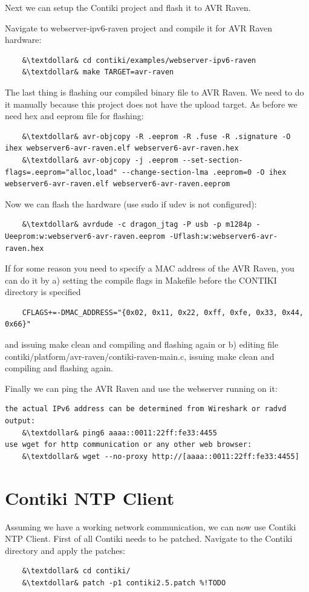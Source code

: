 \documentclass{article}
\begin{document}
Next we can setup the Contiki project and flash it to AVR Raven.

Navigate to webserver-ipv6-raven project and compile it for AVR Raven hardware:
\begin{lstlisting}
	&\textdollar& cd contiki/examples/webserver-ipv6-raven
	&\textdollar& make TARGET=avr-raven
\end{lstlisting}


The last thing is flashing our compiled binary file to AVR Raven. We need to do it manually because this project does not have the upload target.
As before we need hex and eeprom file for flashing:
\begin{lstlisting}
	&\textdollar& avr-objcopy -R .eeprom -R .fuse -R .signature -O ihex webserver6-avr-raven.elf webserver6-avr-raven.hex
	&\textdollar& avr-objcopy -j .eeprom --set-section-flags=.eeprom="alloc,load" --change-section-lma .eeprom=0 -O ihex webserver6-avr-raven.elf webserver6-avr-raven.eeprom
\end{lstlisting}
Now we can flash the hardware (use sudo if udev is not configured):
\begin{lstlisting}
	&\textdollar& avrdude -c dragon_jtag -P usb -p m1284p -Ueeprom:w:webserver6-avr-raven.eeprom -Uflash:w:webserver6-avr-raven.hex
\end{lstlisting}


If for some reason you need to specify a MAC address of the AVR Raven, you can do it by
a) setting the compile flags in Makefile before the CONTIKI directory is specified
\begin{lstlisting}
	CFLAGS+=-DMAC_ADDRESS="{0x02, 0x11, 0x22, 0xff, 0xfe, 0x33, 0x44, 0x66}"
\end{lstlisting}
and issuing make clean and compiling and flashing again
or
b) editing file contiki/platform/avr-raven/contiki-raven-main.c,
issuing make clean and compiling and flashing again.

Finally we can ping the AVR Raven and use the webserver running on it:
\begin{lstlisting}
the actual IPv6 address can be determined from Wireshark or radvd output:
	&\textdollar& ping6 aaaa::0011:22ff:fe33:4455
use wget for http communication or any other web browser:
	&\textdollar& wget --no-proxy http://[aaaa::0011:22ff:fe33:4455]
\end{lstlisting}

\section{Contiki NTP Client}
Assuming we have a working network communication,
we can now use Contiki NTP Client.
First of all Contiki needs to be patched.
Navigate to the Contiki directory and apply the patches:
\begin{lstlisting}
	&\textdollar& cd contiki/
	&\textdollar& patch -p1 contiki2.5.patch %!TODO
\end{lstlisting}
\end{document}
